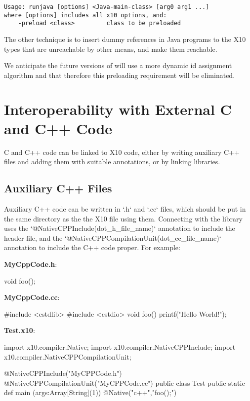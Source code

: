 \begin{verbatim}
Usage: runjava [options] <Java-main-class> [arg0 arg1 ...]
where [options] includes all x10 options, and:
    -preload <class>         class to be preloaded
\end{verbatim}

The other technique is to insert dummy references in Java programs to
the X10 types that are unreachable by other means, and make them
reachable.

We anticipate the future versions of \Xten{} will use a more dynamic
id assignment algorithm and that therefore this preloading requirement
will be eliminated.

\section{Interoperability with External C and C++ Code}

C and C++ code can be linked to X10 code, either by writing auxiliary C++ files and
adding them with suitable annotations, or by linking libraries.

\subsection{Auxiliary C++ Files}

Auxiliary C++ code can be written in \xcd`.h` and \xcd`.cc` files, which
should be put in the same directory as the the X10 file using them.
Connecting with the library uses the \xcd`@NativeCPPInclude(dot_h_file_name)`
annotation to include the header file, and the 
\xcd`@NativeCPPCompilationUnit(dot_cc_file_name)` annotation to include the
C++ code proper.  For example: 

{\bf MyCppCode.h}: 
\begin{xten}
void foo();
\end{xten}


{\bf MyCppCode.cc}:
\begin{xten}
#include <cstdlib>
#include <cstdio>
void foo() {
    printf("Hello World!\n");
}
\end{xten}

{\bf Test.x10}:
\begin{xten}
import x10.compiler.Native;
import x10.compiler.NativeCPPInclude;
import x10.compiler.NativeCPPCompilationUnit;

@NativeCPPInclude("MyCPPCode.h")
@NativeCPPCompilationUnit("MyCPPCode.cc")
public class Test {
    public static def main (args:Array[String](1)) {
        { @Native("c++","foo();") {} }
    }
}
\end{xten}

